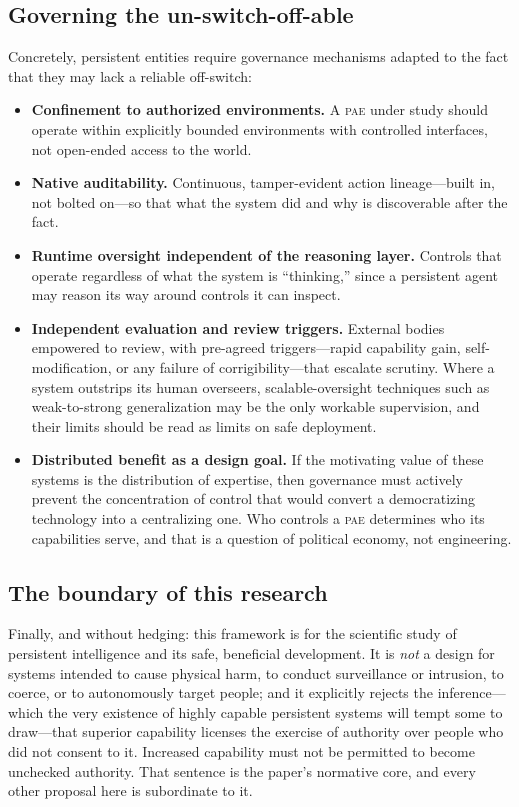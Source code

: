 \documentclass[11pt,a4paper]{article}
\theoremstyle{definition}
\newcommand{\pae}{\textsc{pae}\xspace}
\begin{document}
\subsection{Governing the un-switch-off-able}

Concretely, persistent entities require governance mechanisms adapted to the fact that they may lack a reliable off-switch:

\begin{itemize}[leftmargin=1.4em]
  \item \textbf{Confinement to authorized environments.} A \pae{} under study should operate within explicitly bounded environments with controlled interfaces, not open-ended access to the world.
  \item \textbf{Native auditability.} Continuous, tamper-evident action lineage---built in, not bolted on---so that what the system did and why is discoverable after the fact.
  \item \textbf{Runtime oversight independent of the reasoning layer.} Controls that operate regardless of what the system is ``thinking,'' since a persistent agent may reason its way around controls it can inspect.
  \item \textbf{Independent evaluation and review triggers.} External bodies empowered to review, with pre-agreed triggers---rapid capability gain, self-modification, or any failure of corrigibility---that escalate scrutiny. Where a system outstrips its human overseers, scalable-oversight techniques such as weak-to-strong generalization \citep{burns2023w2s} may be the only workable supervision, and their limits should be read as limits on safe deployment.
  \item \textbf{Distributed benefit as a design goal.} If the motivating value of these systems is the distribution of expertise, then governance must actively prevent the concentration of control that would convert a democratizing technology into a centralizing one. Who controls a \pae{} determines who its capabilities serve, and that is a question of political economy, not engineering.
\end{itemize}

\subsection{The boundary of this research}

Finally, and without hedging: this framework is for the scientific study of persistent intelligence and its safe, beneficial development. It is \emph{not} a design for systems intended to cause physical harm, to conduct surveillance or intrusion, to coerce, or to autonomously target people; and it explicitly rejects the inference---which the very existence of highly capable persistent systems will tempt some to draw---that superior capability licenses the exercise of authority over people who did not consent to it. Increased capability must not be permitted to become unchecked authority. That sentence is the paper's normative core, and every other proposal here is subordinate to it.
\end{document}
